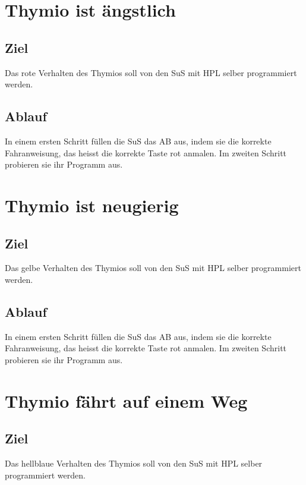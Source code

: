 \documentclass[12pt]{article}
\begin{document}
\section*{Thymio ist ängstlich}
\subsection*{Ziel}
Das rote Verhalten des Thymios soll von den SuS mit HPL selber programmiert werden.





\subsection*{Ablauf}
In einem ersten Schritt füllen die SuS das AB aus, indem sie die korrekte Fahranweisung, das heisst die korrekte Taste rot anmalen. Im zweiten Schritt probieren sie ihr Programm aus.


\section*{Thymio ist neugierig}
\subsection*{Ziel}
Das gelbe Verhalten des Thymios soll von den SuS mit HPL selber programmiert werden.
\subsection*{Ablauf}
In einem ersten Schritt füllen die SuS das AB aus, indem sie die korrekte Fahranweisung, das heisst die korrekte Taste rot anmalen. Im zweiten Schritt probieren sie ihr Programm aus.

\section*{Thymio fährt auf einem Weg}
\subsection*{Ziel}
Das hellblaue Verhalten des Thymios soll von den SuS mit HPL selber programmiert werden.
\end{document}
